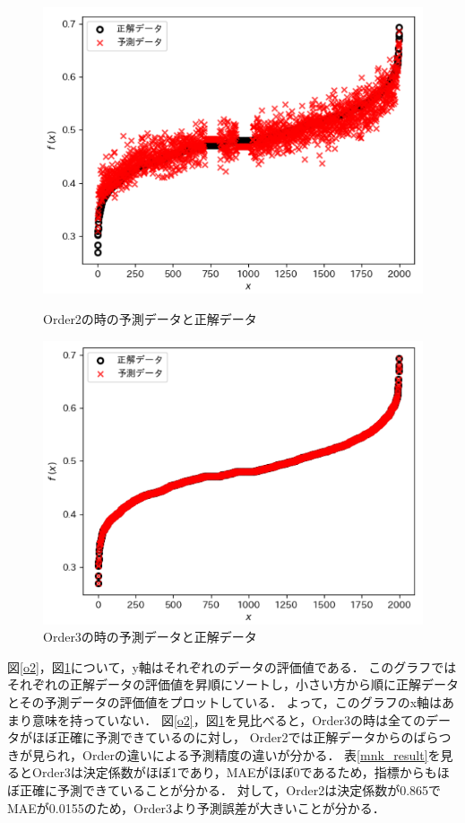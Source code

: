 \documentclass[main]{subfiles}
\begin{document}
        \begin{figure}
          \begin{minipage}[b]{0.45\linewidth}
            \centering
            \includegraphics[width=\linewidth]{figures/o2.png}
            \caption{Order2の時の予測データと正解データ}
            \label{o2}  
          \end{minipage}
          \begin{minipage}[b]{0.45\linewidth}
            \centering
            \includegraphics[width=\linewidth]{figures/o3.png}
            \caption{Order3の時の予測データと正解データ}
            \label{o3}
          \end{minipage}
        \end{figure}
        図\ref{o2}，図\ref{o3}について，y軸はそれぞれのデータの評価値である．
        このグラフではそれぞれの正解データの評価値を昇順にソートし，小さい方から順に正解データとその予測データの評価値をプロットしている．
        よって，このグラフのx軸はあまり意味を持っていない．
        図\ref{o2}，図\ref{o3}を見比べると，Order3の時は全てのデータがほぼ正確に予測できているのに対し，
        Order2では正解データからのばらつきが見られ，Orderの違いによる予測精度の違いが分かる．
        表\ref{mnk_result}を見るとOrder3は決定係数がほぼ1であり，MAEがほぼ0であるため，指標からもほぼ正確に予測できていることが分かる．
        対して，Order2は決定係数が0.865でMAEが0.0155のため，Order3より予測誤差が大きいことが分かる．
\end{document}
